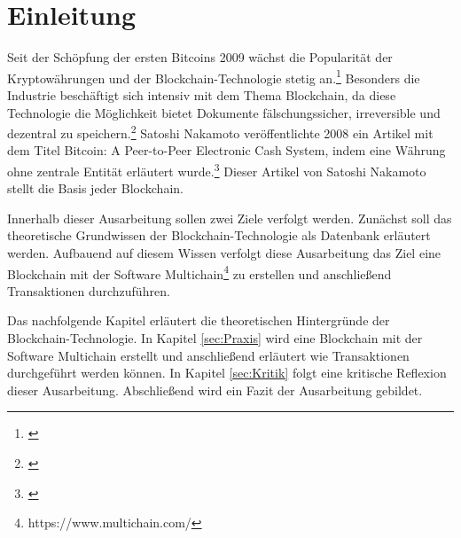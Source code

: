 \section{Einleitung}
\label{sec:Einleitung}
Seit der Sch{\"o}pfung der ersten Bitcoins 2009 w{\"a}chst die Popularit{\"a}t der Kryptow{\"a}hrungen und der Blockchain-Technologie stetig an.\footnote{\cite[S.~312]{Neugebauer.2018}} Besonders die Industrie besch{\"a}ftigt sich intensiv mit dem Thema Blockchain, da diese Technologie die M{\"o}glichkeit bietet Dokumente f{\"a}lschungssicher, irreversible und dezentral zu speichern.\footnote{\cite[S.~312]{Neugebauer.2018}} Satoshi Nakamoto ver{\"o}ffentlichte 2008 ein Artikel mit dem Titel {\glqq}Bitcoin: A Peer-to-Peer Electronic Cash System{\grqq}, indem eine W{\"a}hrung ohne zentrale Entit{\"a}t erl{\"a}utert wurde.\footnote{\cite[S.~1]{SatoshiNakamoto.}} Dieser Artikel von Satoshi Nakamoto stellt die Basis jeder Blockchain.

Innerhalb dieser Ausarbeitung sollen zwei Ziele verfolgt werden. Zunächst soll das theoretische Grundwissen der Blockchain-Technologie als Datenbank erläutert werden. Aufbauend auf diesem Wissen verfolgt diese Ausarbeitung das Ziel eine Blockchain mit der Software Multichain\footnote{https://www.multichain.com/} zu erstellen und anschließend Transaktionen durchzuführen.

Das nachfolgende Kapitel erläutert die theoretischen Hintergründe der Blockchain-Technologie. In Kapitel \ref{sec:Praxis} wird eine Blockchain mit der Software Multichain erstellt und anschließend erläutert wie Transaktionen durchgeführt werden können. In Kapitel \ref{sec:Kritik} folgt eine kritische Reflexion dieser Ausarbeitung. Abschließend wird ein Fazit der Ausarbeitung gebildet.